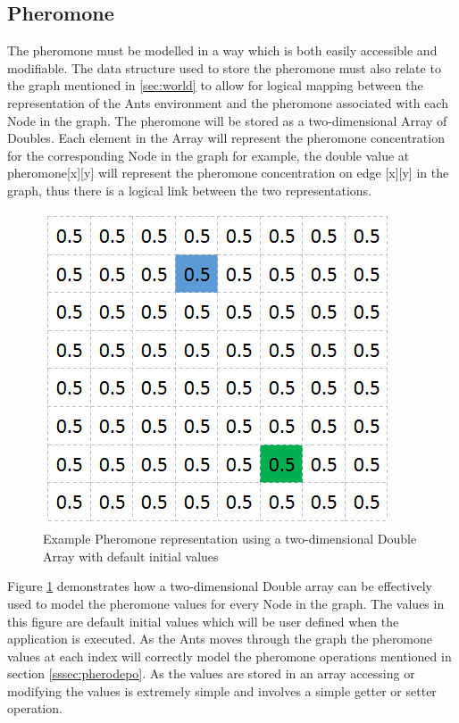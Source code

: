 \subsection{Pheromone}
\label{pheroRepsec}
The pheromone must be modelled in a way which is both easily accessible and modifiable. The data structure used to store the pheromone must also relate to the graph mentioned in \ref{sec:world} to allow for logical mapping between the representation of the Ants environment and the pheromone associated with each Node in the graph. The pheromone will be stored as a two-dimensional Array of Doubles. Each element in the Array will represent the pheromone concentration for the corresponding Node in the graph for example, the double value at pheromone[x][y] will represent the pheromone concentration on edge [x][y] in the graph, thus there is a logical link between the two representations.

\begin{figure}[H]
\centering
\includegraphics[scale=0.8]{Images/phero}
\caption{Example Pheromone representation using a two-dimensional Double Array with default initial values}
\label{fig:pheroRep}
\end{figure}

\noindent
Figure \ref{fig:pheroRep} demonstrates how a two-dimensional Double array can be effectively used to model the pheromone values for every Node in the graph. The values in this figure are default initial values which will be user defined when the application is executed. As the Ants moves through the graph the pheromone values at each index will correctly model the pheromone operations mentioned in section \ref{sssec:pherodepo}. As the values are stored in an array accessing or modifying the values is extremely simple and involves a simple getter or setter operation.

